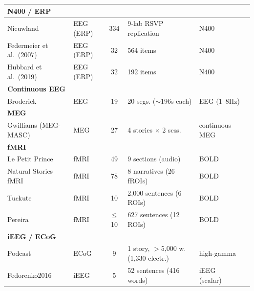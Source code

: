 {\begin{longtable}{@{}p{2.45cm}p{1.5cm}cp{2.6cm}p{1.8cm}>{\raggedright\arraybackslash}p{2.0cm}@{}}
\midrule
\multicolumn{6}{l}{\textbf{N400 / ERP}} \\
\midrule
\small Nieuwland & \small EEG (ERP) & \small 334 & \small 9-lab RSVP replication & \small N400 & \scriptsize \citep{nieuwland2018largescale} \\
\small Federmeier et al.\ (2007) & \small EEG (ERP) & \small 32 & \small 564 items & \small N400 & \scriptsize \citep{federmeier2007multiple,szewczyk2022context} \\
\small Hubbard et al.\ (2019) & \small EEG (ERP) & \small 32 & \small 192 items & \small N400 & \scriptsize \citep{szewczyk2022context} \\
\midrule
\multicolumn{6}{l}{\textbf{Continuous EEG}} \\
\midrule
\small Broderick & \small EEG & \small 19 & \small 20 segs. ($\sim$196s each) & \small EEG (1--8Hz) & \scriptsize \citep{broderick2018electrophysiological} \\
\midrule
\multicolumn{6}{l}{\textbf{MEG}} \\
\midrule
\small Gwilliams (MEG-MASC) & \small MEG & \small 27 & \small 4 stories $\times$ 2 sess. & \small continuous MEG & \scriptsize \citep{gwilliams2022neural} \\
\midrule
\multicolumn{6}{l}{\textbf{fMRI}} \\
\midrule
\small Le Petit Prince & \small fMRI & \small 49 & \small 9 sections (audio) & \small BOLD & \scriptsize \citep{li2022lepetitprince} \\
\small Natural Stories fMRI & \small fMRI & \small 78 & \small 8 narratives (26 fROIs) & \small BOLD & \scriptsize \citep{shain2022robust} \\
\small Tuckute & \small fMRI & \small 10 & \small 2{,}000 sentences (6 ROIs) & \small BOLD & \scriptsize \citep{tuckute2024driving} \\
\small Pereira & \small fMRI & \small $\leq$10 & \small 627 sentences (12 ROIs) & \small BOLD & \scriptsize \citep{pereira2018toward} \\
\midrule
\multicolumn{6}{l}{\textbf{iEEG / ECoG}} \\
\midrule
\small Podcast & \small ECoG & \small 9 & \small 1 story, $>$5{,}000 w. (1{,}330 electr.) & \small high-gamma & \scriptsize \citep{zada2025podcast} \\
\small Fedorenko2016 & \small iEEG & \small 5 & \small 52 sentences (416 words) & \small iEEG (scalar) & \scriptsize \citep{fedorenko2016neural} \\
\end{longtable}
}